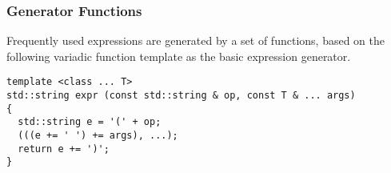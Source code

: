 
\subsubsection{\SMTLIB{} Generator Functions}





Frequently used \SMTLIB{} expressions are generated by a set of functions, based on the following variadic function template as the basic expression generator.

\begin{lstlisting}[style=c++]
template <class ... T>
std::string expr (const std::string & op, const T & ... args)
{
  std::string e = '(' + op;
  (((e += ' ') += args), ...);
  return e += ')';
}
\end{lstlisting}

